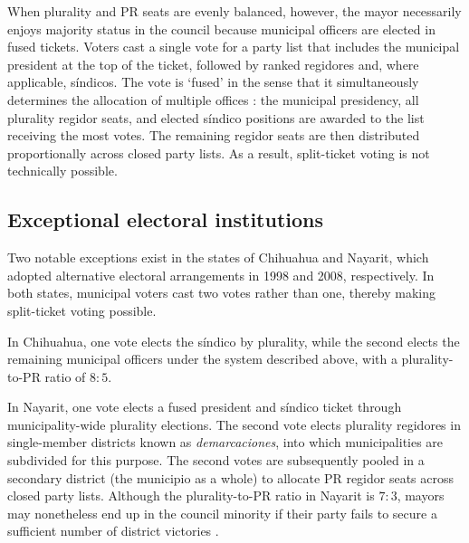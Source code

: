 \documentclass[letter,12pt]{article}
\begin{document}
When plurality and PR seats are evenly balanced, however, the mayor necessarily enjoys majority status in the council because municipal officers are elected in fused tickets. Voters cast a single vote for a party list that includes the municipal president at the top of the ticket, followed by ranked regidores and, where applicable, síndicos. The vote is `fused' in the sense that it simultaneously determines the allocation of multiple offices \citep[see ][:42]{cox.1997}: the municipal presidency, all plurality regidor seats, and elected síndico positions are awarded to the list receiving the most votes. The remaining regidor seats are then distributed proportionally across closed party lists. As a result, split-ticket voting is not technically possible.

\subsection{Exceptional electoral institutions}
Two notable exceptions exist in the states of Chihuahua and Nayarit, which adopted alternative electoral arrangements in 1998 and 2008, respectively. In both states, municipal voters cast two votes rather than one, thereby making split-ticket voting possible.

In Chihuahua, one vote elects the síndico by plurality, while the second elects the remaining municipal officers under the system described above, with a plurality-to-PR ratio of $8:5$.

In Nayarit, one vote elects a fused president and síndico ticket through municipality-wide plurality elections. The second vote elects plurality regidores in single-member districts known as \emph{demarcaciones}, into which municipalities are subdivided for this purpose. The second votes are subsequently pooled in a secondary district (the municipio as a whole) to allocate PR regidor seats across closed party lists. Although the plurality-to-PR ratio in Nayarit is $7:3$, mayors may nonetheless end up in the council minority if their party fails to secure a sufficient number of district victories \citep{lucardi.magar.2019}.
\end{document}
